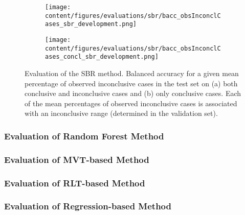 \begin{figure}[t]
    \begin{subfigure}{0.9\textwidth}
      \centering
      \texttt{[image: content/figures/evaluations/sbr/bacc\_obsInconclCases\_sbr\_development.png]}
      \subcaption{}
      \label{fig:bacc_obsInconclCases_sbr_development}
    \end{subfigure}
    \hfill
    \begin{subfigure}{0.9\textwidth}
      \centering
      \texttt{[image: content/figures/evaluations/sbr/bacc\_obsInconclCases\_concl\_sbr\_development.png]}
      \subcaption{}
      \label{fig:bacc_obsInconclCases_concl_sbr_development}
    \end{subfigure}

    \caption{Evaluation of the SBR method. Balanced accuracy for a given mean percentage of observed inconclusive cases in the test set on 
    (a) both conclusive and inconclusive cases and (b) only conclusive cases. 
    Each of the mean percentages of observed inconclusive cases is associated with an inconclusive range (determined in the validation set). }
    \label{fig:bacc_obsInconclCases_sbr_development_full}
\end{figure}





\subsubsection{Evaluation of Random Forest Method}
\label{subsubsec:eval_rfc}




\subsubsection{Evaluation of MVT-based Method}
\label{subsubsec:eval_mvt}


\subsubsection{Evaluation of RLT-based Method}
\label{subsubsec:eval_rlt}


\subsubsection{Evaluation of Regression-based Method}
\label{subsubsec:eval_regression}




